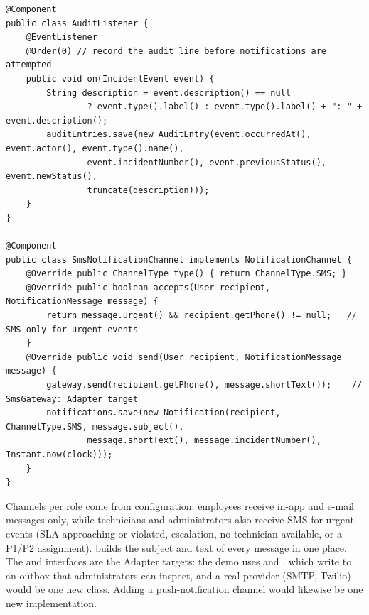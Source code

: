 \begin{lstlisting}[caption={The audit observer and the SMS channel, which uses the SmsGateway adapter}]
@Component
public class AuditListener {
    @EventListener
    @Order(0) // record the audit line before notifications are attempted
    public void on(IncidentEvent event) {
        String description = event.description() == null
                ? event.type().label() : event.type().label() + ": " + event.description();
        auditEntries.save(new AuditEntry(event.occurredAt(), event.actor(), event.type().name(),
                event.incidentNumber(), event.previousStatus(), event.newStatus(),
                truncate(description)));
    }
}

@Component
public class SmsNotificationChannel implements NotificationChannel {
    @Override public ChannelType type() { return ChannelType.SMS; }
    @Override public boolean accepts(User recipient, NotificationMessage message) {
        return message.urgent() && recipient.getPhone() != null;   // SMS only for urgent events
    }
    @Override public void send(User recipient, NotificationMessage message) {
        gateway.send(recipient.getPhone(), message.shortText());    // SmsGateway: Adapter target
        notifications.save(new Notification(recipient, ChannelType.SMS, message.subject(),
                message.shortText(), message.incidentNumber(), Instant.now(clock)));
    }
}
\end{lstlisting}

Channels per role come from configuration: employees receive in-app and e-mail messages only, while technicians and administrators also receive SMS for urgent events (SLA approaching or violated, escalation, no technician available, or a P1/P2 assignment).  builds the subject and text of every message in one place. The  and  interfaces are the Adapter targets: the demo uses  and , which write to an outbox that administrators can inspect, and a real provider (SMTP, Twilio) would be one new class. Adding a push-notification channel would likewise be one new  implementation.


